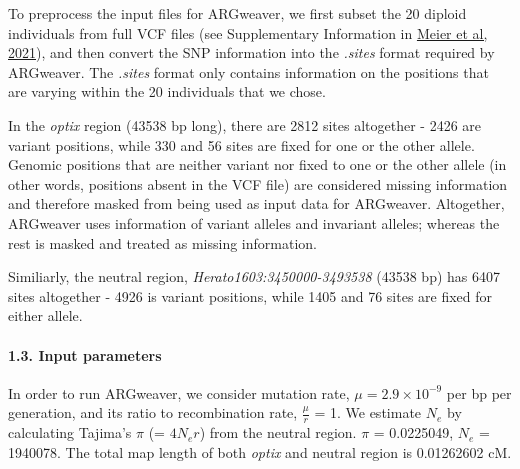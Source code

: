 \documentclass[
]{article}
\begin{document}
\hfill\break
To preprocess the input files for ARGweaver, we first subset the 20
diploid individuals from full VCF files (see Supplementary Information
in \href{https://www.pnas.org/doi/10.1073/pnas.2015005118}{Meier et al,
2021}), and then convert the SNP information into the \emph{.sites}
format required by ARGweaver. The \emph{.sites} format only contains
information on the positions that are varying within the 20 individuals
that we chose.

In the \textit{optix} region (43538 bp long), there are 2812 sites
altogether - 2426 are variant positions, while 330 and 56 sites are
fixed for one or the other allele. Genomic positions that are neither
variant nor fixed to one or the other allele (in other words, positions
absent in the VCF file) are considered missing information and therefore
masked from being used as input data for ARGweaver. Altogether,
ARGweaver uses information of variant alleles and invariant alleles;
whereas the rest is masked and treated as missing information.

Similiarly, the neutral region, \emph{Herato1603:3450000-3493538}
(43538 bp) has 6407 sites altogether - 4926 is variant positions, while
1405 and 76 sites are fixed for either allele.

\hypertarget{input-parameters}{%
\paragraph{\texorpdfstring{1.3. Input parameters\\
}{1.3. Input parameters }}\label{input-parameters}}

\hfill\break
In order to run ARGweaver, we consider mutation rate,
\(\mu = 2.9 \times 10^{-9}\) per bp per generation, and its ratio to
recombination rate, \(\frac{\mu}{r}\) = 1. We estimate \(N_e\) by
calculating Tajima's \(\pi\) (= \(4N_e r\)) from the neutral region.
\(\pi\) = 0.0225049, \(N_e\) = 1940078. The total map length of both
\emph{optix} and neutral region is 0.01262602 cM.\\
\end{document}
